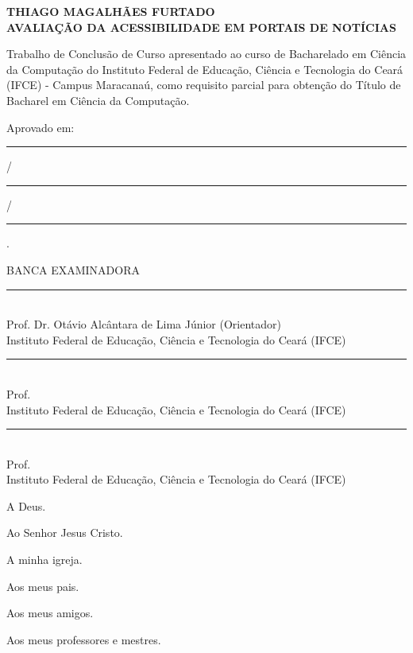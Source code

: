 \documentclass[a4paper]{article}
\begin{document}
\begin{titlepage}
	\vfill
	\begin{center}
		\onehalfspacing
		\fontsize{12pt}{0pt}\selectfont
		{\large \textbf{THIAGO MAGALHÃES FURTADO}} \\[1.5cm]
		\fontsize{12pt}{0pt}\selectfont
		{\large \textbf{AVALIAÇÃO DA ACESSIBILIDADE EM PORTAIS DE NOTÍCIAS}}\\[3cm]
		
		\hspace{.45\textwidth} %
		\begin{minipage}{.5\textwidth}
			\large Trabalho de Conclusão de Curso apresentado ao curso de Bacharelado em Ciência da Computação do Instituto Federal de Educação, Ciência e Tecnologia do Ceará (IFCE) - Campus Maracanaú, como requisito parcial para obtenção do Título de Bacharel em Ciência da Computação.\\[1cm]
		\end{minipage}
	\end{center}
	
	Aprovado em:  \rule{1cm}{0.01cm} /\rule{1cm}{0.01cm} /\rule{1cm}{0.01cm}.\\[0.5cm]
	
	\begin{center}
		\onehalfspacing
		\fontsize{12pt}{0pt}\selectfont
		{\large{BANCA EXAMINADORA}}\\[1cm]
		\rule{13cm}{0.01cm}\\[0.1cm]
		Prof. Dr. Otávio Alcântara de Lima Júnior (Orientador)\\[0.1cm]
		Instituto Federal de Educação, Ciência e Tecnologia do Ceará (IFCE)\\[1.5cm]
		\rule{13cm}{0.01cm}\\[0.1cm]
		Prof. \\[0.1cm]
		Instituto Federal de Educação, Ciência e Tecnologia do Ceará (IFCE)\\[1.5cm]
		\rule{13cm}{0.01cm}\\[0.1cm]
		Prof. \\[0.1cm]
		Instituto Federal de Educação, Ciência e Tecnologia do Ceará (IFCE)\\
	\end{center}
\end{titlepage}

\begin{titlepage}
	
	\hfill \parbox{7.5cm}{A Deus.}
	
	\hfill \parbox{7.5cm}{Ao Senhor Jesus Cristo.}
	
	\hfill \parbox{7.5cm}{A minha igreja.}
	
	\hfill \parbox{7.5cm}{Aos meus pais.}

	\hfill \parbox{7.5cm}{Aos meus amigos.}
	
	\hfill \parbox{7.5cm}{Aos meus professores e mestres.}
\end{titlepage}
\end{document}

